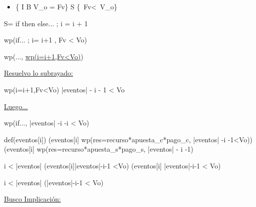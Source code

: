 \begin{itemize}
    \item\{{ I \wedge  B \wedge  V_o =  Fv\} S \{\ Fv<\ V_o\}
    }
\end{itemize}
\vspace{0.3cm}

S= if then else... ; i = i + 1

\vspace{0.3cm}

\equiv  wp(if... ; i= i+1 , Fv < Vo)

\vspace{0.3cm}

\equiv wp(..., \underline{wp(i=i+1,Fv<Vo)})  

\vspace{0.3cm}

\underline{Resuelvo lo subrayado:}

\vspace{0.3cm}

 \equiv wp(i=i+1,Fv<Vo) \equiv |eventos| - i - 1 < Vo

\vspace{0.3cm}

\underline{Luego...}

\vspace{0.3cm}


\equiv wp(if..., |eventos| -i -i < Vo)

\vspace{0.3cm}

\vspace{0.3cm}

\equiv def(eventos[i]) \yLuego (eventos[i] \wedge wp(res=recurso*apuesta_c*pago_c, |eventos| -i -1<Vo))\\
\phantom{.} \hspace{15} \vee (\neg eventos[i] \wedge wp(res=recurso*apuesta_s*pago_s, |eventos| - i -1)

\vspace{0.3cm}

 \leq i < |eventos| \yLuego (eventos[i]\wedge |eventos|-i-1 <Vo) \vee (\neg eventos[i] \wedge |eventos|-i-1 < Vo)

\vspace{0.3cm}

\leq i < |eventos| \yLuego (|eventos|-i-1 < Vo)

\vspace{0.8cm}

 \underline{Busco Implicaci\'on:}


